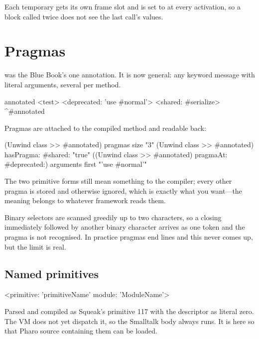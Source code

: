 Each temporary gets its own frame slot and is set to  at every
activation, so a block called twice does not see the last call's values.

\section{Pragmas}

 was the Blue Book's one annotation. It is now general:
any keyword message with literal arguments, several per method.

\begin{st}
annotated
    <test>
    <deprecated: 'use #normal'>
    <shared: #serialize>
    ^#annotated
\end{st}

Pragmas are attached to the compiled method and readable back:

\begin{st}
(Unwind class >> #annotated) pragmas size                        "3"
(Unwind class >> #annotated) hasPragma: #shared:                 "true"
((Unwind class >> #annotated) pragmaAt: #deprecated:) arguments first
                                                     "'use #normal'"
\end{st}

The two primitive forms still mean something to the compiler; every other
pragma is stored and otherwise ignored, which is exactly what you want---the
meaning belongs to whatever framework reads them.

\begin{stnote}
Binary selectors are scanned greedily up to two characters, so a closing
\ct{>} immediately followed by another binary character arrives as one token
and the pragma is not recognised. In practice pragmas end lines and this never
comes up, but the limit is real.
\end{stnote}

\subsection{Named primitives}

\begin{st}
<primitive: 'primitiveName' module: 'ModuleName'>
\end{st}

Parsed and compiled as Squeak's primitive 117 with the descriptor as literal
zero. The VM does not yet dispatch it, so the Smalltalk body always runs. It
is here so that Pharo source containing them can be loaded.

